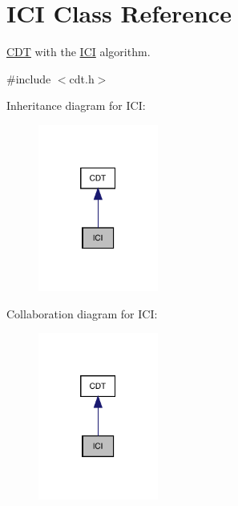 \hypertarget{class_i_c_i}{}\section{I\+CI Class Reference}
\label{class_i_c_i}


\mbox{\hyperlink{class_c_d_t}{C\+DT}} with the \mbox{\hyperlink{class_i_c_i}{I\+CI}} algorithm.  




{\ttfamily \#include $<$cdt.\+h$>$}



Inheritance diagram for I\+CI\+:
\nopagebreak
\begin{figure}[H]
\begin{center}
\leavevmode
\includegraphics[width=112pt]{class_i_c_i__inherit__graph}
\end{center}
\end{figure}


Collaboration diagram for I\+CI\+:
\nopagebreak
\begin{figure}[H]
\begin{center}
\leavevmode
\includegraphics[width=112pt]{class_i_c_i__coll__graph}
\end{center}
\end{figure}
